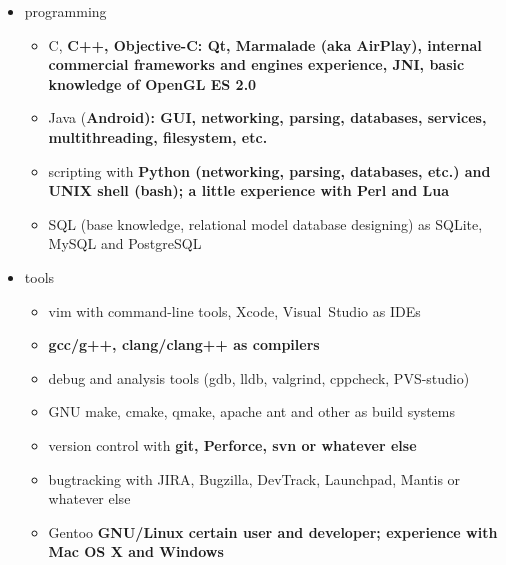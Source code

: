 \begin{itemize}

\item programming

    \begin{itemize}
    \item C, \bfseries C++\mdseries, Objective-C:
    Qt, Marmalade (aka AirPlay), internal commercial frameworks and engines experience,
    \bfseries JNI\mdseries, basic knowledge of OpenGL ES 2.0


    \item Java (\bfseries Android\mdseries):
    GUI, networking, parsing, databases, services, multithreading, filesystem, etc.


    \item scripting with
    \bfseries Python \mdseries (networking, parsing, databases, etc.)
    and
    \bfseries UNIX shell (bash)\mdseries;
    a little experience with
    \bfseries Perl \mdseries and \bfseries Lua\mdseries

    \item SQL (base knowledge, relational model database designing)
as SQLite, MySQL and PostgreSQL
    \end{itemize}

\item tools

    \begin{itemize}
    \item vim with command-line tools, Xcode, Visual~Studio as IDEs
    \item \bfseries gcc/g++\mdseries, clang/clang++ as compilers
    \item debug and analysis tools (gdb, lldb, valgrind, cppcheck, PVS-studio)
    \item GNU make, cmake, qmake, apache ant and other as build systems
    \item version control with \bfseries git\mdseries, Perforce, svn or whatever else
    \item bugtracking with JIRA, Bugzilla, DevTrack, Launchpad, Mantis or whatever else
    \item Gentoo \bfseries GNU/Linux \mdseries certain user and developer;
    experience with \bfseries Mac OS X \mdseries and Windows
    \end{itemize}

\end{itemize}

